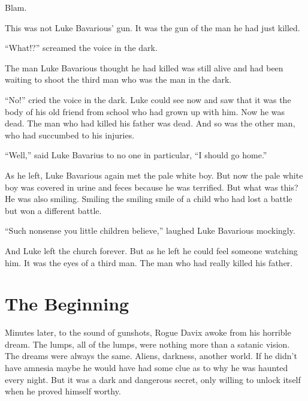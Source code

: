 Blam.



This was not Luke Bavarious' gun. It was the gun of the man
he had just killed.



``What!?'' screamed the voice in the dark.



The man Luke Bavarious thought he had killed was still alive and
had been waiting to shoot the third man who was the man in the
dark.



``No!'' cried the voice in the dark. Luke could see now
and saw that it was the body of his old friend from school who had
grown up with him. Now he was dead. The man who had killed his
father was dead. And so was the other man, who had succumbed to his
injuries.



``Well,'' said Luke Bavarius to no one in particular,
``I should go home.''



As he left, Luke Bavarious again met the pale white boy. But now
the pale white boy was covered in urine and feces because he was
terrified. But what was this? He was also smiling. Smiling the
smiling smile of a child who had lost a battle but won a different
battle.



``Such nonsense you little children believe,'' laughed
Luke Bavarious mockingly.



And Luke left the church forever. But as he left he could feel
someone watching him. It was the eyes of a third man. The man who
had really killed his father. 
 



\chapter{The Beginning}


Minutes later, to the sound of gunshots, Rogue Davix awoke from his
horrible dream. The lumps, all of the lumps, were nothing more than
a satanic vision. The dreams were always the same. Aliens,
darkness, another world. If he didn't have amnesia maybe he
would have had some clue as to why he was haunted every night. But
it was a dark and dangerous secret, only willing to unlock itself
when he proved himself worthy.



